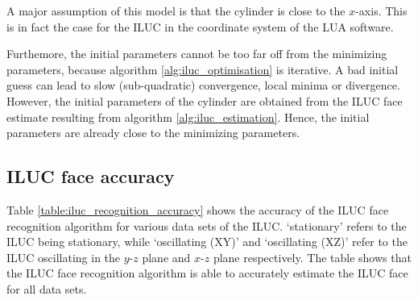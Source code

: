 A major assumption of this model is that the cylinder is close to the $x$-axis. This is in fact the case for the ILUC in the coordinate system of the LUA software.

Furthemore, the initial parameters cannot be too far off from the minimizing parameters, because algorithm \ref{alg:iluc_optimisation} is iterative. A bad initial guess can lead to slow (sub-quadratic) convergence, local minima or divergence. However, the initial parameters of the cylinder are obtained from the ILUC face estimate resulting from algorithm \ref{alg:iluc_estimation}. Hence, the initial parameters are already close to the minimizing parameters.

\subsection{ILUC face accuracy}
Table \ref{table:iluc_recognition_accuracy} shows the accuracy of the ILUC face recognition algorithm for various data sets of the ILUC. `stationary' refers to the ILUC being stationary, while `oscillating (XY)' and `oscillating (XZ)' refer to the ILUC oscillating in the $y$-$z$ plane and $x$-$z$ plane respectively. The table shows that the ILUC face recognition algorithm is able to accurately estimate the ILUC face for all data sets.
